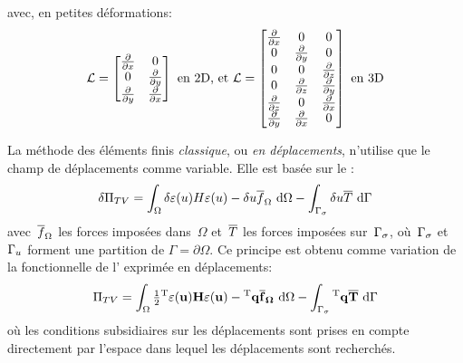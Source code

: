 avec, en petites déformations:
\begin{equation}
  \MM{\cL} = \MM*{
          \tfrac{\partial}{\partial x} & 0\\
          0 & \tfrac{\partial}{\partial y}\\
          \tfrac{\partial}{\partial y} &
          \tfrac{\partial}{\partial x}
      }
  \text{ en 2D, et }
  \MM{\cL} = \MM*{
          \tfrac{\partial}{\partial x} & 0 & 0\\
          0 & \tfrac{\partial}{\partial y} & 0\\
          0 & 0 & \tfrac{\partial}{\partial z}\\
          0 & \tfrac{\partial}{\partial z} &
          \tfrac{\partial}{\partial y}\\
          \tfrac{\partial}{\partial z} & 0&
          \tfrac{\partial}{\partial x} \\
          \tfrac{\partial}{\partial y} &
          \tfrac{\partial}{\partial x} &0\\
      }
  \text{ en 3D}
\end{equation}

\medskip
La méthode des éléments finis \emph{classique}, ou \emph{en déplacements}, n'utilise que le champ de déplacements comme variable. Elle est basée sur le :
\begin{equation}
  \label{Eq:deltaPiTV}
  \delta\Pi_{TV} = \displaystyle\int_{\Omega} \delta\varepsilon(u)H\varepsilon(u)
      - \delta u\overline{f}_{\Omega} \ \text{d}\Omega
      -\displaystyle\int_{\Gamma_\sigma} \delta u\overline{T} \ \text{d}\Gamma
\end{equation}
avec~$\overline{f}_{\Omega}$ les forces imposées dans~$\Omega$ et~$\overline{T}$ les forces imposées sur~$\Gamma_\sigma$, où~$\Gamma_\sigma$ et~$\Gamma_u$ forment une partition de $\Gamma=\partial\Omega$.
\medskip
Ce principe est obtenu comme variation de la fonctionnelle de l' exprimée en déplacements:
\begin{equation}
  \label{Eq:PiTV}
  \Pi_{TV} = \dint_{\Omega} \tfrac12 \LL{\varepsilon(u)}\MM{H}\VV{\varepsilon(u)}
      - \LL{q}\VV{\fbar} \ \dd\Omega
      -\dint_{\ls} \LL{q}\VV{\Tbar} \ \dd\Gamma
\end{equation}
où les conditions subsidiaires sur les déplacements sont prises en compte directement par l'espace dans lequel les déplacements sont recherchés.

